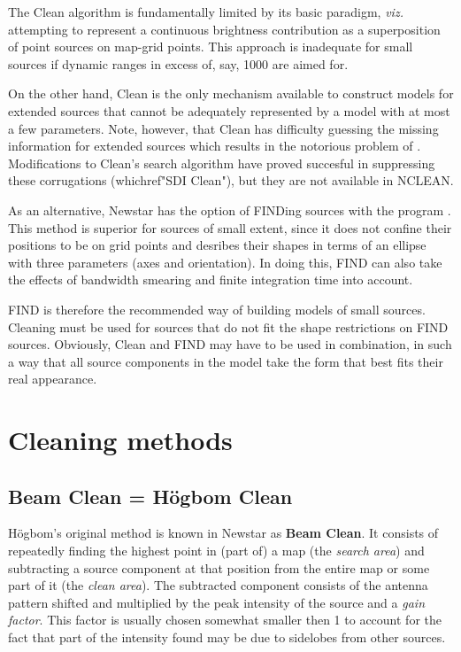 	The Clean algorithm is fundamentally limited by its basic paradigm,
{\em viz.} attempting to represent a continuous brightness contribution as a
superposition of point sources on map-grid points. This approach is inadequate
for small sources if dynamic ranges in excess of, say, 1000 are aimed for.

	On the other hand, Clean is the only mechanism available to construct
models for extended sources that cannot be adequately represented by a model
with at most a few parameters. Note, however, that Clean has difficulty
guessing the missing information for extended sources which results in the
notorious problem of . Modifications to Clean's
search algorithm have proved succesful in suppressing these corrugations
(whichref{"SDI Clean"}{}), but they are not available in NCLEAN.

	As an alternative, Newstar has the option of FINDing sources with the
program .  This method is superior for sources of
small extent, since it does not confine their positions to be on grid points
and desribes their shapes in terms of an ellipse with three parameters (axes
and orientation).  In doing this, FIND can also take the effects of bandwidth
smearing and finite integration time into account.

	FIND is therefore the recommended way of building models of small
sources.  Cleaning must be used for sources that do not fit the shape
restrictions on FIND sources.  Obviously, Clean and FIND may have to be used in
combination, in such a way that all source components in the model take the
form that best fits their real appearance.


\section{ Cleaning methods} %
\subsection{ Beam Clean = H\"ogbom Clean}
\label{.beam.clean}

	H\"ogbom's original  method is known in Newstar
as {\bf Beam Clean}.  It consists of repeatedly finding the highest point in
(part of) a map (the {\em search area}) and subtracting a source component at
that position from the entire map or some part of it (the {\em clean area}).
The subtracted component consists of the antenna pattern shifted and multiplied
by the peak intensity of the source and a {\em gain factor}.  This factor is
usually chosen somewhat smaller then 1 to account for the fact that part of the
intensity found may be due to sidelobes from other sources.

